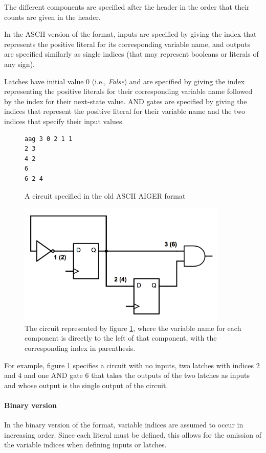 \documentclass[12pt,a4paper,twoside,openright]{report}
\begin{document}
{{The different components are specified after the header
in the order that their counts are given in the header.

In the ASCII version of the format, inputs are specified by giving the
index that represents the positive literal for its corresponding variable name,
and outputs are specified similarly as single indices (that may represent
booleans or literals of any sign).

Latches have initial value 0 (i.e., {\it False}) and are specified by giving the
index representing the positive literals for their corresponding variable name
followed by the index for their next-state value.
AND gates are specified by giving the indices that represent the positive literal
for their variable name and the two indices that specify their input values.

\begin{figure}[h]
\centering
\begin{verbatim}
aag 3 0 2 1 1
2 3
4 2
6
6 2 4
\end{verbatim}
\caption{
A circuit specified in the old ASCII AIGER format
}
\label{aagCircuit}
\end{figure}

\begin{figure}[h]
\centering
\includegraphics[width=100mm]{circuit.png}
\caption{The circuit represented by figure \ref{aagCircuit}, where
the variable name for each component is directly to the left of that
component, with the corresponding index in parenthesis.}
\end{figure}

For example, figure \ref{aagCircuit} specifies a circuit with
no inputs, two latches with indices $2$ and $4$ and one AND gate
$6$ that takes the outputs of the two latches as inputs and whose
output is the single output of the circuit.}

\paragraph{Binary version}{
In the binary version of the format, variable indices are assumed to
occur in increasing order. Since each literal must be defined, this allows
for the omission of the variable indices when defining inputs or latches.

}}
\end{document}
